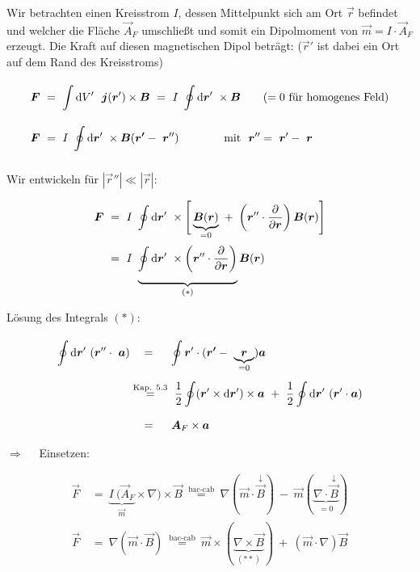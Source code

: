 Wir betrachten einen Kreisstrom $I$, dessen Mittelpunkt sich am Ort $\vec{r}$ befindet und welcher die Fläche $\vec{A}_F$ umschließt und somit ein Dipolmoment von $\vec{m} = I \cdot \vec{A}_F$ erzeugt. Die Kraft auf diesen magnetischen Dipol beträgt: ($\vec{r}'$ ist dabei ein Ort auf dem Rand des Kreisstroms)

\begin{align*}
\vec{F} \ &= \ \Int{}{}{V'} \ \vec{j}(\vec{r}') \times \vec{B}  \ = \ I \ \Oint{}{}{\vec{r}'} \times\vec{B} \qquad (= 0 \text{ für homogenes Feld})\\
\vec{F} \ &= \ I \ \Oint{}{}{\vec{r}'} \times \vec{B}(\vec{r'} - \ \vec{r}'') \qquad\qquad \text{mit }\  \vec{r}''  = \ \vec{r}' - \ \vec{r} 
\end{align*}

Wir entwickeln für $|\vec{r}''| \ll |\vec{r}|$: 

\begin{align*}
\bm{F} \ &= \ I \ \oint\limits_{{}}^{{}}\mathrm{d}{\bm{r}'}\  \times \Bigg[ \underbrace{\bm{B}(\bm{r})}_{=0} \ + \ \left(\bm{r}'' \cdot\frac{\partial{}}{\partial{\bm{r}}}\right)\bm{B}(\bm{r})\Bigg]\\
&= \ I \ \underbrace{\oint\limits_{{}}^{{}}\mathrm{d}{\bm{r}'}\ \times\left(\bm{r}'' \cdot \frac{\partial{}}{\partial{\bm{r}}}\right)}_{(*)}\bm{B}(\bm{r}) 
\end{align*}

Lösung des Integrals $(*)$:

\begin{align*}
\Oint{}{}{\vec{r}'} (\vec{r}''\cdot \ \vec{a}) & \quad = \quad \ \oint{}{}{\vec{r}'} \cdot (\vec{r'}- \ \underbrace{\vec{r}}_{=0}) \vec{a}\\
& \overset{\text{Kap. 5.3}}{=} \ \frac{1}{2}\oint(\vec{r}'\times\d\vec{r}')\times\vec{a} \ + \ \frac{1}{2}\Oint{}{}{\vec{r}'}(\vec{r}'\cdot\vec{a})\\
& \quad = \quad \ \vec{A}_F \times\vec{a}
\end{align*}

$\Rightarrow\quad$ Einsetzen:

\begin{align*}
\vec{F}  \ &= \ \underbrace{I \ (\vec{A}_F}_{\vec{m}} \times \nabla)\times \vec{B} \ \overset{\text{bac-cab}}{=} \ \nabla(\vec{m}\cdot\overset{\downarrow}{\vec{B}}) \ - \ \vec{m}(\underbrace{\nabla\cdot\overset{\downarrow}{\vec{B}}}_{=0})\\
\vec{F}  \ &= \ \nabla(\vec{m}\cdot\vec{B}) \ \overset{\text{bac-cab}}{=} \ \vec{m} \times (\underbrace{\nabla\times\vec{B}}_{(**)}) \ + \ (\vec{m}\cdot\nabla)\vec{B}
\end{align*}

